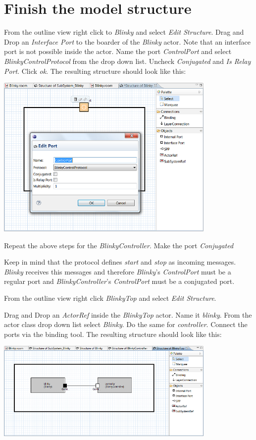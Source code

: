 \section{Finish the model structure}

From the outline view right click to \textit{Blinky} and select \textit{Edit Structure}. Drag and Drop an 
\textit{Interface Port} to the boarder of the \textit{Blinky} actor. Note that an interface port is not 
possible inside the actor. Name the port \textit{ControlPort} and select \textit{BlinkyControlProtocol} 
from the drop down list. Uncheck \textit{Conjugated} and \textit{Is Relay Port}. Click \textit{ok}. The 
resulting structure should look like this:

\includegraphics[width=0.8\textwidth]{images/020-Blinky04.png}

Repeat the above steps for the \textit{BlinkyController}. Make the port \textit{Conjugated}

Keep in mind that the protocol defines \textit{start} and \textit{stop} as incoming messages. 
\textit{Blinky} receives this messages and therefore \textit{Blinky}'s \textit{ControlPort} must be a 
regular port and \textit{BlinkyController}'s \textit{ControlPort} must be a conjugated port.


From the outline view right click \textit{BlinkyTop} and select \textit{Edit Structure}.

Drag and Drop an \textit{ActorRef} inside the \textit{BlinkyTop} actor. Name it \textit{blinky}. From the 
actor class drop down list select \textit{Blinky}. Do the same for \textit{controller}. Connect the ports 
via the binding tool. The resulting structure should look like this:

\includegraphics[width=0.8\textwidth]{images/020-Blinky05.png}


